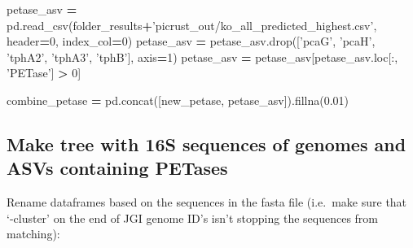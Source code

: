 \documentclass[
]{article}
\newenvironment{Shaded}{\begin{snugshade}}{\end{snugshade}}
\newcommand{\DecValTok}[1]{\textcolor[rgb]{0.00,0.00,0.81}{#1}}
\newcommand{\FloatTok}[1]{\textcolor[rgb]{0.00,0.00,0.81}{#1}}
\newcommand{\NormalTok}[1]{#1}
\newcommand{\OperatorTok}[1]{\textcolor[rgb]{0.81,0.36,0.00}{\textbf{#1}}}
\newcommand{\StringTok}[1]{\textcolor[rgb]{0.31,0.60,0.02}{#1}}
\begin{document}
\begin{Shaded}
\begin{Highlighting}[]
\NormalTok{petase_asv }\OperatorTok{=}\NormalTok{ pd.read_csv(folder_results}\OperatorTok{+}\StringTok{'picrust_out/ko_all_predicted_highest.csv'}\NormalTok{, header}\OperatorTok{=}\DecValTok{0}\NormalTok{, index_col}\OperatorTok{=}\DecValTok{0}\NormalTok{)}
\NormalTok{petase_asv }\OperatorTok{=}\NormalTok{ petase_asv.drop([}\StringTok{'pcaG'}\NormalTok{, }\StringTok{'pcaH'}\NormalTok{, }\StringTok{'tphA2'}\NormalTok{, }\StringTok{'tphA3'}\NormalTok{, }\StringTok{'tphB'}\NormalTok{], axis}\OperatorTok{=}\DecValTok{1}\NormalTok{)}
\NormalTok{petase_asv }\OperatorTok{=}\NormalTok{ petase_asv[petase_asv.loc[:, }\StringTok{'PETase'}\NormalTok{] }\OperatorTok{>} \DecValTok{0}\NormalTok{]}

\NormalTok{combine_petase }\OperatorTok{=}\NormalTok{ pd.concat([new_petase, petase_asv]).fillna(}\FloatTok{0.01}\NormalTok{)}
\end{Highlighting}
\end{Shaded}

\hypertarget{make-tree-with-16s-sequences-of-genomes-and-asvs-containing-petases}{%
\subsection{Make tree with 16S sequences of genomes and ASVs containing
PETases}\label{make-tree-with-16s-sequences-of-genomes-and-asvs-containing-petases}}

Rename dataframes based on the sequences in the fasta file (i.e.~make
sure that `-cluster' on the end of JGI genome ID's isn't stopping the
sequences from matching):
\end{document}
